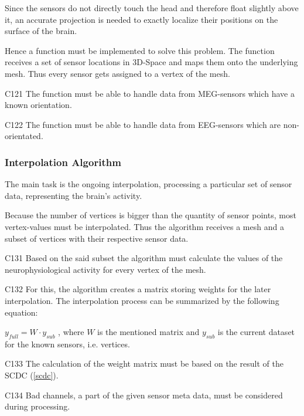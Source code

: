 	Since the sensors do not directly touch the head and therefore float slightly above it, an accurate projection is needed to 
	exactly localize their positions on the surface of the brain. %
	
	Hence a function must be implemented to solve this problem. 
	The function receives a set of sensor locations in 3D-Space and maps them onto the underlying mesh. Thus every 			sensor gets assigned to a vertex of the mesh. 

	\begin{aims}
	
		\item[C121] The function must be able to handle data from MEG-sensors which have a known orientation.
		\item[C122] The function must be able to handle data from EEG-sensors which are non-orientated.
	
	\end{aims}

\subsubsection{Interpolation Algorithm} \label{interpolation} 

	The main task is the ongoing interpolation, processing a particular set of sensor data, representing the brain's 			activity.
	
	Because the number of vertices is bigger than the quantity of sensor points, most vertex-values must be interpolated.
	Thus the algorithm receives a mesh and a subset of vertices with their respective sensor data.  
	
	\begin{aims}
	
		\item[C131] Based on the said subset the algorithm must calculate the values of the neurophysiological activity for every vertex of the mesh.
		\item[C132] For this, the algorithm creates a matrix storing weights for the later interpolation.
					The interpolation process can be summarized by the following equation: 
					
					$y_{full} = W \cdot y_{sub}$
					, where $W$ is the mentioned matrix and $y_{sub}$ is the current dataset for the known sensors, i.e. 							vertices.
		\item[C133] The calculation of the weight matrix must be based on the result of the SCDC (\ref{scdc}).
		\item[C134] Bad channels, a part of the given sensor meta data, must be considered during processing. 
	
	\end{aims}


